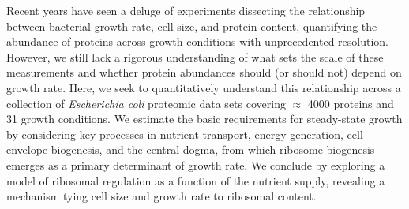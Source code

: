 Recent years have seen a deluge of experiments dissecting the relationship
between bacterial growth rate, cell size, and protein content, quantifying the
abundance of proteins across growth conditions with unprecedented
resolution. However, we still lack a rigorous understanding of what sets the
scale of these measurements and whether protein abundances should (or should not)
depend on growth rate. Here, we seek to quantitatively understand this
relationship across a collection of
\textit{Escherichia coli} proteomic data sets covering $\approx$ 4000 proteins
and 31 growth conditions. We estimate the basic requirements for steady-state
growth by considering key processes in nutrient transport, energy generation, cell envelope
biogenesis, and the central dogma, from which ribosome biogenesis
emerges as a primary determinant of growth rate. We conclude by exploring a
model of ribosomal regulation as a function of the nutrient supply, revealing a
mechanism tying cell size and growth rate to ribosomal content.
